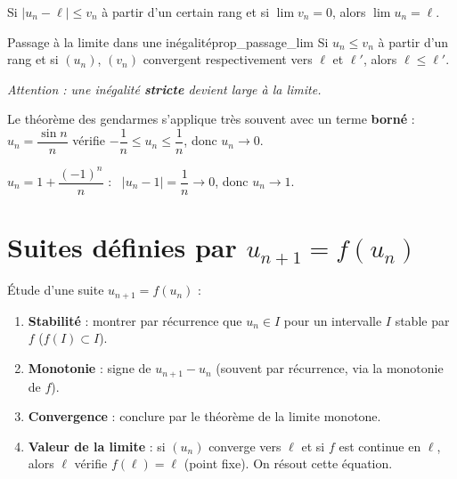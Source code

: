 \begin{theoreme}
	Si $\bigl|u_n-\ell\bigr|\leq v_n$ à partir d'un certain rang et si
	$\displaystyle\lim v_n=0$, alors $\displaystyle\lim u_n=\ell$.
\end{theoreme}

\begin{propriete}{Passage à la limite dans une inégalité}{prop_passage_lim}
	Si $u_n\leq v_n$ à partir d'un rang et si $(u_n)$, $(v_n)$ convergent
	respectivement vers $\ell$ et $\ell'$, alors $\ell\leq\ell'$.

	\emph{Attention : une inégalité \textbf{stricte} devient large à la limite.}
\end{propriete}

\begin{astucebac}
	Le théorème des gendarmes s'applique très souvent avec un terme
	\textbf{borné} : $u_n=\dfrac{\sin n}{n}$ vérifie
	$-\dfrac{1}{n}\leq u_n\leq\dfrac{1}{n}$, donc $u_n\to 0$.
\end{astucebac}

\begin{exemple}
	$u_n=1+\dfrac{(-1)^{n}}{n}$ : \ $\bigl|u_n-1\bigr|=\dfrac{1}{n}\to 0$,
	donc $u_n\to 1$.
\end{exemple}


\section{Suites définies par \texorpdfstring{$u_{n+1}=f(u_n)$}{u(n+1)=f(u(n))}}

\begin{methode}
	Étude d'une suite $u_{n+1}=f(u_n)$ :
	\begin{enumerate}
		\item \textbf{Stabilité} : montrer par récurrence que $u_n\in I$ pour
		un intervalle $I$ stable par $f$ ($f(I)\subset I$).
		\item \textbf{Monotonie} : signe de $u_{n+1}-u_n$ (souvent par
		récurrence, via la monotonie de $f$).
		\item \textbf{Convergence} : conclure par le théorème de la limite
		monotone.
		\item \textbf{Valeur de la limite} : si $(u_n)$ converge vers $\ell$ et
		si $f$ est continue en $\ell$, alors $\ell$ vérifie
		$\boxed{f(\ell)=\ell}$ (point fixe). On résout cette équation.
	\end{enumerate}
\end{methode}

